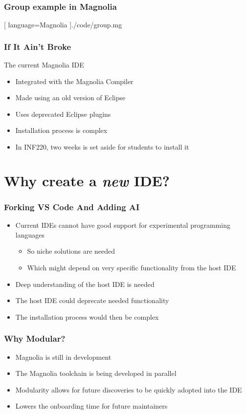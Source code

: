 \begin{frame}
    \frametitle{Group example in Magnolia}
    \begin{center}
      
      [ language=Magnolia
      ]{./code/group.mg}
    \end{center}
\end{frame}

\begin{frame}
  \frametitle{If It Ain't Broke}
  The current Magnolia IDE
  \pause
  \begin{itemize}
    \item Integrated with the Magnolia Compiler
    \pause
    \item Made using an old version of Eclipse
    \pause
    \item Uses deprecated Eclipse plugins
    \pause
    \item Installation process is complex
    \pause
    \item In INF220, two weeks is set aside for students to install it
  \end{itemize}
\end{frame}

\section{Why create a \textit{new} IDE?}
\SectionPage

\begin{frame}
  \frametitle{Forking VS Code And Adding AI}
  \begin{itemize}
    \item Current IDEs cannot have good support for experimental programming
      languages
      \pause
      \begin{itemize}
        \item So niche solutions are needed
          \pause
        \item Which might depend on very specific functionality from the host
          IDE
          \pause
      \end{itemize}
    \item Deep understanding of the host IDE is needed
      \pause
    \item The host IDE could deprecate needed functionality
    \item The installation process would then be complex
  \end{itemize}
\end{frame}

\begin{frame}
  \frametitle{Why Modular?}
  \begin{itemize}
    \item Magnolia is still in development
      \pause
    \item The Magnolia toolchain is being developed in parallel
      \pause
    \item Modularity allows for future discoveries to be quickly adopted into
      the IDE
      \pause
    \item Lowers the onboarding time for future maintainers
  \end{itemize}
\end{frame}
